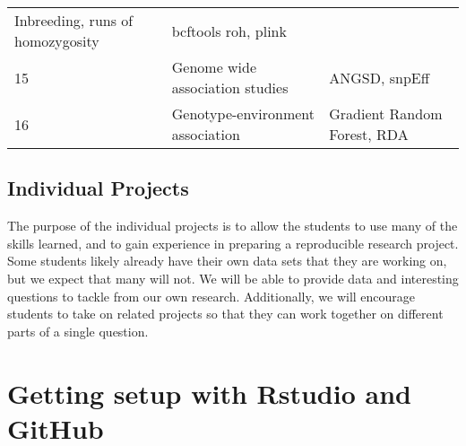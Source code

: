 \documentclass[]{book}
\begin{document}
\begin{longtable}[]{@{}lll@{}}
\begin{minipage}[t]{0.46\columnwidth}
Inbreeding, runs of homozygosity\strut
\end{minipage} & \begin{minipage}[t]{0.33\columnwidth}\raggedright
bcftools roh, plink\strut
\end{minipage}\tabularnewline
\begin{minipage}[t]{0.13\columnwidth}\raggedright
15\strut
\end{minipage} & \begin{minipage}[t]{0.46\columnwidth}\raggedright
Genome wide association studies\strut
\end{minipage} & \begin{minipage}[t]{0.33\columnwidth}\raggedright
ANGSD, snpEff\strut
\end{minipage}\tabularnewline
\begin{minipage}[t]{0.13\columnwidth}\raggedright
16\strut
\end{minipage} & \begin{minipage}[t]{0.46\columnwidth}\raggedright
Genotype-environment association\strut
\end{minipage} & \begin{minipage}[t]{0.33\columnwidth}\raggedright
Gradient Random Forest, RDA\strut
\end{minipage}\tabularnewline
\bottomrule
\end{longtable}

\hypertarget{indproj}{%
\section*{Individual Projects}\label{indproj}}

The purpose of the individual projects is to allow the students to use
many of the skills learned, and to gain experience in preparing a reproducible
research project. Some students likely already have their own data sets
that they are working on, but we expect that many will not. We will be
able to provide data and interesting questions to tackle from our own research.
Additionally, we will encourage students to take on related projects so that
they can work together on different parts of a single question.

\hypertarget{getting-setup-with-rstudio-and-github}{%
\chapter{Getting setup with Rstudio and GitHub}\label{getting-setup-with-rstudio-and-github}}
\end{document}
